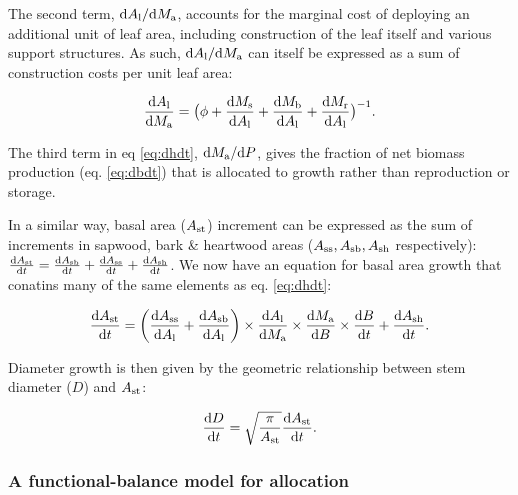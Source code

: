 \documentclass[a4paper,11pt]{article}
\begin{document}
The second term, ${\rm d}A_{\rm l} / {\rm d}M_{\rm a}$,
accounts for the marginal cost of deploying an additional unit of leaf
area, including construction of the leaf itself and various support
structures. As such, ${\rm d}A_{\rm l} / {\rm d}M_{\rm a}$
can itself be expressed as a sum of construction costs per unit leaf
area:

\begin{equation}\label{eq:daldmt}
\frac{{\rm d}A_{\rm l}}{{\rm d}M_{\rm a}}
= \big(\phi
 + \frac{{\rm d}M_\textrm{s}}{{\rm d}A_{\rm l}} + \frac{{\rm d}M_{\rm b}}{{\rm d}A_{\rm l}} + \frac{{\rm d}M_{\rm r}}{{\rm d}A_{\rm l}}\big)^{-1}.
\end{equation}

The third term in eq \ref{eq:dhdt},
${\rm d}M_{\rm a} / {\rm d}P$, gives the fraction of net
biomass production (eq. \ref{eq:dbdt}) that is allocated to growth
rather than reproduction or storage.

In a similar way, basal area ($A_{\rm st}$) increment can be
expressed as the sum of increments in sapwood, bark \& heartwood areas
($A_\textrm{ss}, A_{\rm sb}, A_{\rm sh}$ respectively):
$\frac{{\rm d}A_{\rm st}}{{\rm d}t}= \frac{{\rm d}A_{\rm sb}}{{\rm d}t} + \frac{{\rm d}A_\textrm{ss}}{{\rm d}t} + \frac{{\rm d}A_{\rm sh}}{{\rm d}t}$.
We now have an equation for basal area growth that conatins many of the same
elements as eq. \ref{eq:dhdt}:

\begin{equation}\label{eq:dast}
\frac{{\rm d}A_{\rm st}}{{\rm d}t}=
\left(\frac{{\rm d}A_\textrm{ss}}{{\rm d}A_{\rm l}} + \frac{{\rm d}A_{\rm sb}}{{\rm d}A_{\rm l}}\right) \times
\frac{{\rm d}A_{\rm l}}{{\rm d}M_{\rm a}} \times \frac{{\rm d}M_{\rm a}}{{\rm d}B} \times \frac{{\rm d}B}{{\rm d}t} +\frac{{\rm d}A_{\rm sh}}{{\rm d}t} .
\end{equation}

Diameter growth is then given by the geometric relationship between stem
diameter ($D$) and $A_{\rm st}$:

\begin{equation} \label{eq:dDdt}
\frac{{\rm d}D}{{\rm d}t}= \sqrt{\frac{\pi}{A_{\rm st}}} \frac{{\rm d}A_{\rm st}}{{\rm d}t}.
\end{equation}

\subsubsection{A functional-balance model for allocation}
\end{document}
